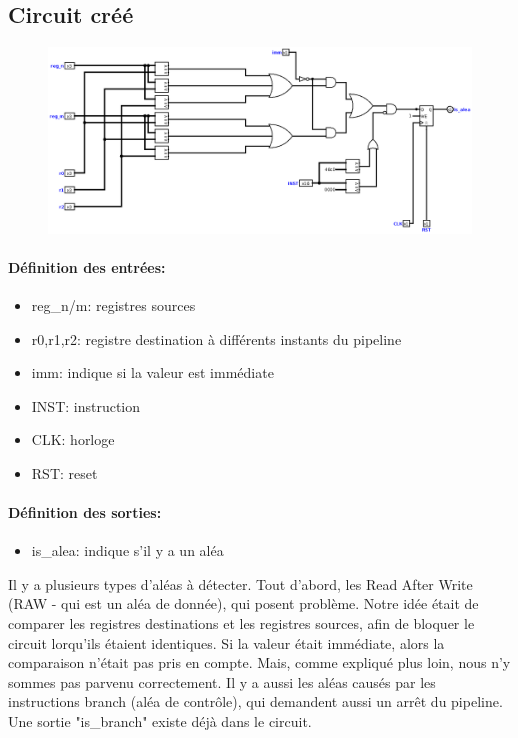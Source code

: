 \documentclass[a4paper]{article} %
\begin{document}
\subsection{Circuit créé}
\begin{figure}[H]
   \centering
   \includegraphics[width=.8\textwidth]{src/ALEAS_jacta_est.png}
\end{figure}


\paragraph{Définition des entrées:}
\begin{itemize}
    \item     reg\_n/m: registres sources
    \item     r0,r1,r2: registre destination à différents instants du pipeline
    \item     imm: indique si la valeur est immédiate
    \item     INST: instruction
    \item     CLK: horloge
    \item     RST: reset
\end{itemize}

\paragraph{Définition des sorties:}
\begin{itemize}
    \item     is\_alea: indique s'il y a un aléa
\end{itemize}
\medskip

Il y a plusieurs types d'aléas à détecter. Tout d'abord, les Read After Write (RAW - qui est un aléa de donnée), qui posent problème. Notre idée était de comparer les registres destinations et les registres sources, afin de bloquer le circuit lorqu'ils étaient identiques. Si la valeur était immédiate, alors la comparaison n'était pas pris en compte. Mais, comme expliqué plus loin, nous n'y sommes pas parvenu correctement.
Il y a aussi les aléas causés par les instructions branch (aléa de contrôle), qui demandent aussi un arrêt du pipeline. Une sortie "is\_branch" existe déjà dans le circuit.
\\
\end{document}
